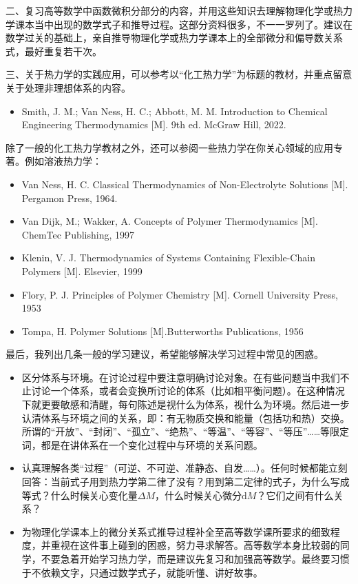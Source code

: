 \documentclass[main.tex]{subfiles}
\begin{document}
二、复习高等数学中函数微积分部分的内容，并用这些知识去理解物理化学或热力学课本当中出现的数学式子和推导过程。这部分资料很多，不一一罗列了。建议在数学过关的基础上，亲自推导物理化学或热力学课本上的全部微分和偏导数关系式，最好重复若干次。

三、关于热力学的实践应用，可以参考以“化工热力学”为标题的教材，并重点留意关于处理非理想体系的内容。
\begin{itemize}
  \item Smith, J. M.; Van Ness, H. C.; Abbott, M. M. Introduction to Chemical Engineering Thermodynamics [M]. 9th ed. McGraw Hill, 2022.
\end{itemize}
除了一般的化工热力学教材之外，还可以参阅一些热力学在你关心领域的应用专著。例如溶液热力学：
\begin{itemize}
  \item Van Ness, H. C. Classical Thermodynamics of Non-Electrolyte Solutions [M]. Pergamon Press, 1964.
  \item Van Dijk, M.; Wakker, A. Concepts of Polymer Thermodynamics [M]. ChemTec Publishing, 1997
  \item Klenin, V. J. Thermodynamics of Systems Containing Flexible-Chain Polymers [M]. Elsevier, 1999
  \item Flory, P. J. Principles of Polymer Chemistry [M]. Cornell University Press, 1953
  \item Tompa, H. Polymer Solutions [M].Butterworths Publications, 1956
\end{itemize}

最后，我列出几条一般的学习建议，希望能够解决学习过程中常见的困惑。
\begin{itemize}
  \item 区分体系与环境。在讨论过程中要注意明确讨论对象。在有些问题当中我们不止讨论一个体系，或者会变换所讨论的体系（比如相平衡问题）。在这种情况下就更要敏感和清醒，每句陈述是视什么为体系，视什么为环境。然后进一步认清体系与环境之间的关系，即：有无物质交换和能量（包括功和热）交换。所谓的“开放”、“封闭”、“孤立”、“绝热”、“等温”、“等容”、“等压”……等限定词，都是在讲体系在一个变化过程中与环境的关系问题。
  \item 认真理解各类“过程”（可逆、不可逆、准静态、自发……）。任何时候都能立刻回答：当前式子用到热力学第二律了没有？用到第二定律的式子，为什么写成等式？什么时候关心变化量$\Delta M$，什么时候关心微分$\mathrm{d}M$？它们之间有什么关系？
  \item 为物理化学课本上的微分关系式推导过程补全至高等数学课所要求的细致程度，并重视在这件事上碰到的困惑，努力寻求解答。高等数学本身比较弱的同学，不要急着开始学习热力学，而是建议先复习和加强高等数学。最终要习惯于不依赖文字，只通过数学式子，就能听懂、讲好故事。
\end{itemize}
\end{document}
